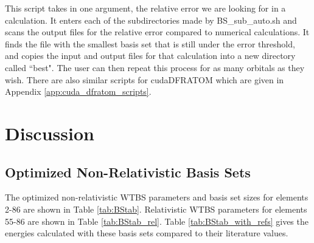 

This script takes in one argument, the relative error we are looking for in a calculation. It enters each of the subdirectories made by BS\_sub\_auto.sh and scans the output files for the relative error compared to numerical calculations. It finds the file with the smallest basis set that is still under the error threshold, and copies the input and output files for that calculation into a new directory called ``best". The user can then repeat this process for as many orbitals as they wish. There are also similar scripts for cudaDFRATOM which are given in Appendix \ref{app:cuda_dfratom_scripts}.

\section{Discussion}
\subsection{Optimized Non-Relativistic Basis Sets}
The optimized non-relativistic WTBS parameters and basis set sizes for elements 2-86 are shown in Table \ref{tab:BStab}. Relativistic WTBS parameters for elements 55-86 are shown in Table \ref{tab:BStab_rel}. Table \ref{tab:BStab_with_refs} gives the energies calculated with these basis sets compared to their literature values.

